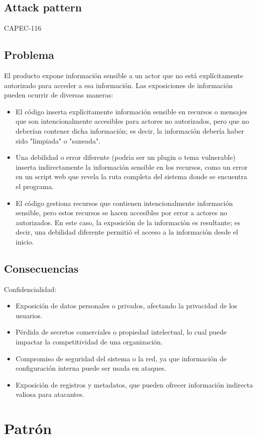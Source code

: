 \subsection*{Attack pattern}
CAPEC-116
\subsection*{Problema}
El producto expone información sensible a un actor que no está explícitamente autorizado para acceder a esa información. Las exposiciones de información pueden ocurrir de diversas maneras:
    \begin{itemize}
        \item El código inserta explícitamente información sensible en recursos o mensajes que son intencionalmente accesibles para actores no autorizados, pero que no deberían contener dicha información; es decir, la información debería haber sido "limpiada" o "saneada".
        \item Una debilidad o error diferente (podria ser un plugin o tema vulnerable) inserta indirectamente la información sensible en los recursos, como un error en un script web que revela la ruta completa del sistema donde se encuentra el programa.
        \item El código gestiona recursos que contienen intencionalmente información sensible, pero estos recursos se hacen accesibles por error a actores no autorizados. En este caso, la exposición de la información es resultante; es decir, una debilidad diferente permitió el acceso a la información desde el inicio.
    \end{itemize}
\subsection*{Consecuencias}
Confidencialidad:
\begin{itemize}
    \item Exposición de datos personales o privados, afectando la privacidad de los usuarios.
    \item Pérdida de secretos comerciales o propiedad intelectual, lo cual puede impactar la competitividad de una organización.
    \item Compromiso de seguridad del sistema o la red, ya que información de configuración interna puede ser usada en ataques.
    \item Exposición de registros y metadatos, que pueden ofrecer información indirecta valiosa para atacantes.
\end{itemize}
\section{Patrón}
